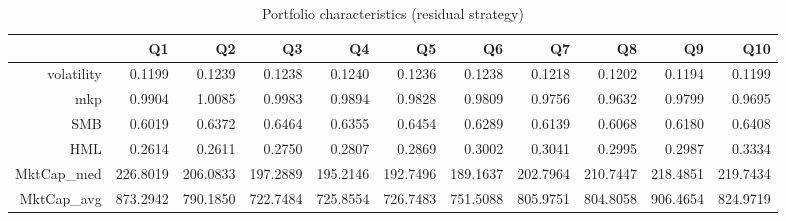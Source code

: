 \begin{table}[ht]
\centering
\begin{tabular}{rrrrrrrrrrr}
  \hline
 & Q1 & Q2 & Q3 & Q4 & Q5 & Q6 & Q7 & Q8 & Q9 & Q10 \\ 
  \hline
volatility & 0.1199 & 0.1239 & 0.1238 & 0.1240 & 0.1236 & 0.1238 & 0.1218 & 0.1202 & 0.1194 & 0.1199 \\ 
  mkp & 0.9904 & 1.0085 & 0.9983 & 0.9894 & 0.9828 & 0.9809 & 0.9756 & 0.9632 & 0.9799 & 0.9695 \\ 
  SMB & 0.6019 & 0.6372 & 0.6464 & 0.6355 & 0.6454 & 0.6289 & 0.6139 & 0.6068 & 0.6180 & 0.6408 \\ 
  HML & 0.2614 & 0.2611 & 0.2750 & 0.2807 & 0.2869 & 0.3002 & 0.3041 & 0.2995 & 0.2987 & 0.3334 \\ 
  MktCap\_med & 226.8019 & 206.0833 & 197.2889 & 195.2146 & 192.7496 & 189.1637 & 202.7964 & 210.7447 & 218.4851 & 219.7434 \\ 
  MktCap\_avg & 873.2942 & 790.1850 & 722.7484 & 725.8554 & 726.7483 & 751.5088 & 805.9751 & 804.8058 & 906.4654 & 824.9719 \\ 
   \hline
\end{tabular}
\caption{Portfolio characteristics (residual strategy)} 
\label{tab:PortChar}
\end{table}
